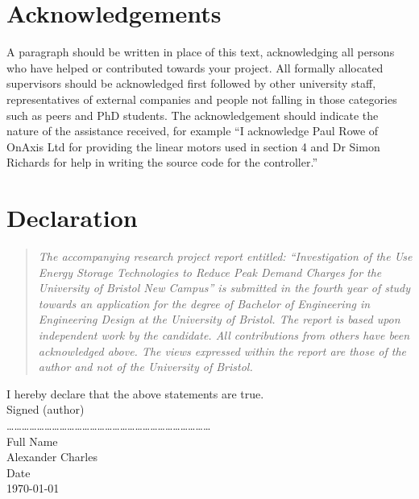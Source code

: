 \documentclass[fontsize=9.5pt]{extarticle}
\numberwithin{figure}{section} %
\newcommand{\AssignmentTitle}{Investigation of the Use Energy Storage Technologies to Reduce Peak Demand Charges for the University of Bristol New Campus}
\newcommand{\StudentNameA}{Alexander Charles}
\begin{document}

\newpage


\section*{Acknowledgements}\label{acknowledgements}
A paragraph should be written in place of this text, acknowledging all persons who have helped or contributed towards your project. All formally allocated supervisors should be acknowledged first followed by other university staff, representatives of external companies and people not falling in those categories such as peers and PhD students. The acknowledgement should indicate the nature of the assistance received, for example “I acknowledge Paul Rowe of OnAxis Ltd for providing the linear motors used in section 4 and Dr Simon Richards for help in writing the source code for the controller.”

\section*{Declaration}\label{declartion}
\begin{quote}
\textit{The accompanying research project report entitled:  “\AssignmentTitle” is submitted in the fourth year of study towards an application for the degree of Bachelor of Engineering in Engineering Design at the University of Bristol. The report is based upon independent work by the candidate. All contributions from others have been acknowledged above. The views expressed within the report are those of the author and not of the University of Bristol.}
\end{quote}
I hereby declare that the above statements are true.
\\[2\baselineskip]
Signed (author)
\\[2\baselineskip]
 ………………………………………………………………………
\\[2\baselineskip]
Full Name
\\[2\baselineskip]
{\large \StudentNameA}
\\[2\baselineskip]
Date
\\[2\baselineskip]
{\large \today}
\end{document}
